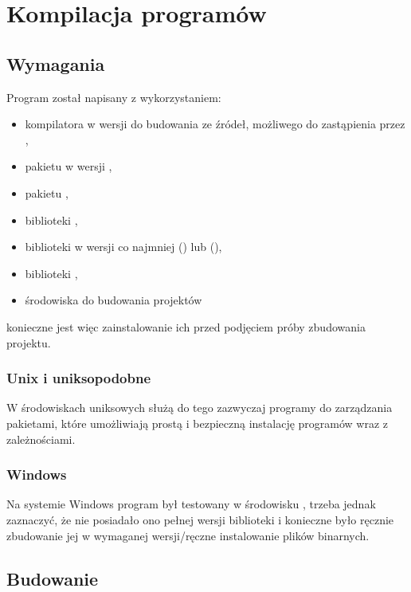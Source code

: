 \documentclass{standalone}
\begin{document}
\appendix

\chapter{Kompilacja programów}

\section{Wymagania}

Program został napisany z wykorzystaniem:
\begin{itemize}
\item kompilatora  w wersji  do budowania ze źródeł, możliwego do zastąpienia przez
 ,
\item pakietu  w wersji ,
\item pakietu ,
\item biblioteki ,
\item biblioteki  w wersji co najmniej  () lub 
(),
\item biblioteki ,
\item środowiska do budowania projektów 
\end{itemize}
konieczne jest więc zainstalowanie ich przed podjęciem próby zbudowania projektu.

\subsection{Unix i uniksopodobne}

W środowiskach uniksowych służą do tego zazwyczaj programy do zarządzania pakietami, które umożliwiają prostą
i bezpieczną instalację programów wraz z zależnościami.

\subsection{Windows}

Na systemie Windows program był testowany w środowisku , trzeba jednak zaznaczyć, że nie posiadało
ono pełnej wersji biblioteki  i konieczne było ręcznie zbudowanie jej w wymaganej wersji/ręczne
instalowanie plików binarnych.

\section{Budowanie}
\end{document}
